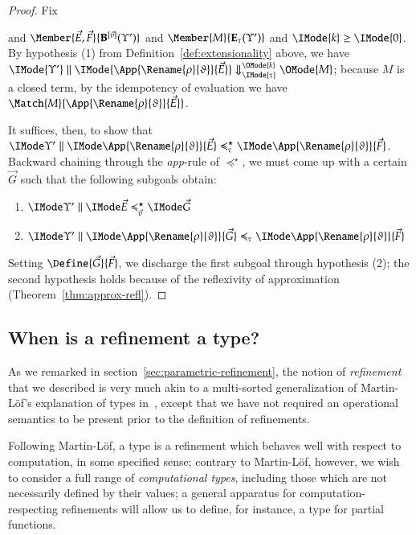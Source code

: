 \documentclass[11pt]{article}
\theoremstyle{definition}
\theoremstyle{notation}
\theoremstyle{remark}
\numberwithin{equation}{section}
\newcommand\EvalN[5]{\IMode{#1}\parallel\IMode{#4}\Downarrow^{\OMode{#3}}_{\IMode{#2}}\OMode{#5}}
\newcommand\Exprs{\mathbf{E}}
\newcommand\BTms{\mathbf{B}}
\begin{document}
\begin{proof}
  Fix
  and $\Member{\vec{E},\vec{F}}{\BTms^{[\vec{v}]}(\Upsilon')}$ and
  $\Member{M}{\Exprs_\tau(\Upsilon')}$ and $\IMode{k}\geq\IMode{0}$.
  By hypothesis (1) from Definition~\ref{def:extensionality} above, we have
  $\EvalN{\Upsilon'}{\tau}{k}{\App{\Rename{\rho}{\vartheta}}{\vec{E}}}{M}$;
  because $M$ is a closed term, by the idempotency of evaluation we have
  $\Match{M}{\App{\Rename{\rho}{\vartheta}}{\vec{E}}}$.

  It suffices, then, to show that
  $\SBinRel{\preccurlyeq^\star_\tau}{\Upsilon'}{\App{\Rename{\rho}{\vartheta}}{\vec{E}}}{\App{\Rename{\rho}{\vartheta}}{\vec{F}}}$.
  Backward chaining through the \textit{app}-rule of $\preccurlyeq^\star$, we must
  come up with a certain $\vec{G}$ such that the following subgoals obtain:
  \begin{enumerate}
    \item $\SBinRel{\preccurlyeq^\star_{\vec{v}}}{\Upsilon'}{\vec{E}}{\vec{G}}$
    \item $\SBinRel{\preccurlyeq_\tau}{\Upsilon'}{\App{\Rename{\rho}{\vartheta}}{\vec{G}}}{\App{\Rename{\rho}{\vartheta}}{\vec{F}}}$
  \end{enumerate}

  Setting $\Define{\vec{G}}{\vec{F}}$, we discharge the first subgoal through
  hypothesis (2); the second hypothesis holds because of the reflexivity of
  approximation (Theorem~\ref{thm:approx-refl}).

\end{proof}

\subsection{When is a refinement a type?}

As we remarked in section~\ref{sec:parametric-refinement}, the notion of
\emph{refinement} that we described is very much akin to a multi-sorted
generalization of Martin-L\"of's explanation of types
in~\cite{martin-lof:1979}, except that we have not required an operational
semantics to be present prior to the definition of refinements.

Following Martin-L\"of, a type is a refinement which behaves well with respect
to computation, in some specified sense; contrary to Martin-L\"of, however, we wish to
consider a full range of \emph{computational types}, including those which are
not necessarily defined by their values; a general apparatus for
computation-respecting refinements will allow us to define, for instance, a
type for partial functions.
\end{document}
